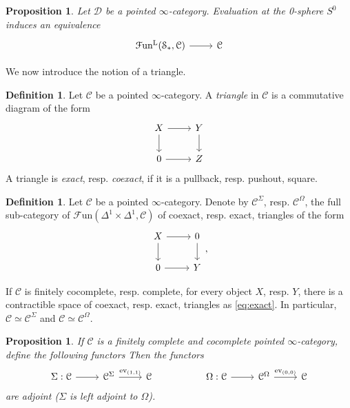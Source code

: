 \documentclass[a4paper]{book}
\newcommand{\lC}{\mathcal{C}}
\newcommand{\lD}{\mathcal{D}}
\newcommand{\lF}{\mathcal{F}}
\newcommand{\mL}{\mathrm{L}}
\newcommand{\lS}{\mathcal{S}}
\newcommand{\Fun}{\lF\mathrm{un}} %
\newtheorem{proposition}[equation]{Proposition}
\theoremstyle{definition}
\newtheorem{definition}[equation]{Definition}
\theoremstyle{remark}
\numberwithin{equation}{section}
\begin{document}
\begin{proposition}
  Let $\lD$ be a pointed $\infty$-category. Evaluation at the 0-sphere $S^0$ induces an equivalence \begin{equation}
    \begin{tikzcd}
      \Fun^\mL(\lS_*,\lC) \arrow[r] & \lC
    \end{tikzcd}
  \end{equation}
\end{proposition}
We now introduce the notion of a {triangle}.
\begin{definition}
  Let $\lC$ be a pointed $\infty$-category. A \emph{triangle} in $\lC$ is a commutative diagram of the form \begin{equation}\label{eq:triangle}
    \begin{tikzcd}
      X \arrow[r] \arrow[d] & Y \arrow[d] \\
      0 \arrow[r] & Z
    \end{tikzcd}
  \end{equation}A triangle is \emph{exact}, resp. \emph{coexact}, if it is a pullback, resp. pushout, square. 
\end{definition}
\begin{definition}
  Let $\lC$ be a pointed $\infty$-category. Denote by $\lC^{\Sigma}$, resp. $\lC^\Omega$, the full sub-category of $\Fun(\Delta^1\times\Delta^1,\lC)$ of coexact, resp. exact, triangles of the form 
  \begin{equation}\label{eq:exact}
  \begin{tikzcd}
   X \arrow[r]  \arrow[d] & 0 \arrow[d] \\ 
   0 \arrow[r] & Y
  \end{tikzcd},
\end{equation}
\end{definition}
If $\lC$ is finitely cocomplete, resp. complete, for every object $X$, resp. $Y$, there is a contractible space of coexact, resp. exact, triangles as \cref{eq:exact}. In particular, $\lC\simeq\lC^\Sigma$ and $\lC\simeq\lC^\Omega$.  
\begin{proposition}
  If $\lC$ is a finitely complete and cocomplete pointed $\infty$-category, define the following functors Then the functors
  \begin{equation}
    \begin{tikzcd}
      \Sigma:\lC \arrow[r] & \lC^\Sigma \arrow[r,"\mathrm{ev}_{(1,1)}"] & \lC  & & \Omega:\lC \arrow[r] & \lC^\Omega \arrow[r,"\mathrm{ev}_{(0,0)}"] & \lC
    \end{tikzcd}
  \end{equation}are adjoint ($\Sigma$ is left adjoint to $\Omega$). 
\end{proposition}
\end{document}
